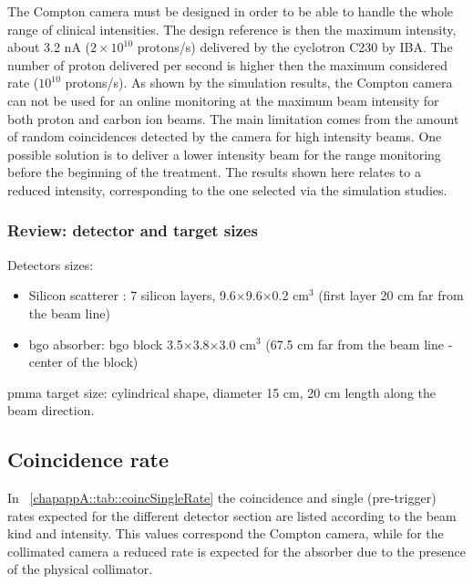 The Compton camera must be designed in order to be able to handle the whole range of clinical intensities. The design reference is then the maximum intensity, about 3.2 nA ($2\times10^{10}$ protons/s) delivered by the cyclotron C230 by IBA. The number of proton delivered per second is higher then the maximum considered rate ($10^{10}$ protons/s).\newline
As shown by the simulation results, the Compton camera can not be used for an online monitoring at the maximum beam intensity for both proton and carbon ion beams. The main limitation comes from the amount of random coincidences detected by the camera for high intensity beams. One possible solution is to deliver a lower intensity beam for the range monitoring before the beginning of the treatment. The results shown here relates to a reduced intensity, corresponding to the one selected via the simulation studies.

\subsubsection{Review: detector and target sizes}\label{chapappA::subsubsec::revDetTargetSize}

Detectors sizes:
\begin{itemize}
	\item Silicon scatterer : 7 silicon layers, 9.6$\times$9.6$\times$0.2 cm$\mathrm{^{3}}$ (first layer 20 cm far from the beam line)
	\item \gls{bgo} absorber: \gls{bgo} block 3.5$\times$3.8$\times$3.0 cm$\mathrm{^{3}}$ (67.5 cm far from the beam line - center of the block)\newline
\end{itemize}
\gls{pmma} target size: cylindrical shape, diameter 15 cm,  20 cm length along the beam direction.


\subsection{Coincidence rate}\label{chapappA::subsec::coincRate}

In \tablename~\ref{chapappA::tab::coincSingleRate} the coincidence and single (pre-trigger) rates expected for the different detector section are listed according to the beam kind and intensity. This values correspond the Compton camera, while for the collimated camera a reduced rate is expected for the absorber due to the presence of the physical collimator.

